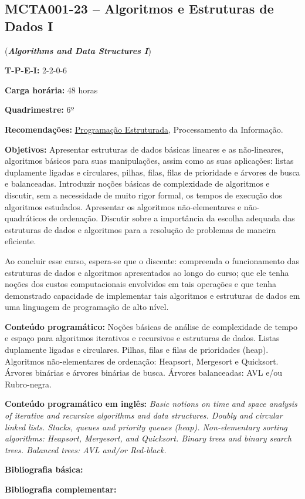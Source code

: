 \documentclass[class=article, crop=false]{standalone}
\begin{document}
\subsection{MCTA001-23 -- Algoritmos e Estruturas de Dados I}
\label{disc:aedI}

(\textbf{\textit{Algorithms and Data Structures I}})

\begin{center}
    \begin{minipage}{0.85\textwidth}
        \textbf{T-P-E-I:} 2-2-0-6
        
        \textbf{Carga horária:} 48 horas
        
        \textbf{Quadrimestre:} 6º
        
        \textbf{Recomendações:} 
        \hyperref[disc:pe]{Programação Estruturada},
        Processamento da Informação.
    \end{minipage}
\end{center}

\textbf{Objetivos:}
Apresentar estruturas de dados básicas lineares e as não-lineares, algoritmos
básicos para suas manipulações, assim como as suas aplicações: listas
duplamente ligadas e circulares, pilhas, filas, filas de prioridade e árvores
de busca e balanceadas. Introduzir noções básicas de complexidade de algoritmos
e discutir, sem a necessidade de muito rigor formal, os tempos de execução dos
algoritmos estudados. Apresentar os algoritmos não-elementares e
não-quadráticos de ordenação. Discutir sobre a importância da escolha adequada
das estruturas de dados e algoritmos para a resolução de problemas de maneira
eficiente.

Ao concluir esse curso, espera-se que o discente: compreenda o funcionamento
das estruturas de dados e algoritmos apresentados ao longo do curso; que ele
tenha noções dos custos computacionais envolvidos em tais operações e que tenha
demonstrado capacidade de implementar tais algoritmos e estruturas de dados em
uma linguagem de programação de alto nível.

\textbf{Conteúdo programático:}
Noções básicas de análise de complexidade de tempo e espaço para algoritmos
iterativos e recursivos e estruturas de dados.
Listas duplamente ligadas e circulares.
Pilhas, filas e filas de prioridades (heap).
Algoritmos não-elementares de ordenação: Heapsort, Mergesort e Quicksort.
Árvores binárias e árvores binárias de busca.
Árvores balanceadas: AVL e/ou Rubro-negra. 

\textbf{Conteúdo programático em inglês:}
\textit{Basic notions on time and space analysis of iterative and recursive
algorithms and data structures.
Doubly and circular linked lists.
Stacks, queues and priority queues (heap).
Non-elementary sorting algorithms: Heapsort, Mergesort, and Quicksort.
Binary trees and binary search trees.
Balanced trees: AVL and/or Red-black.}

\newrefsection
\textbf{Bibliografia básica:}
\nocite{1998-sedgewick, 2010-szwarcfiter-markenzon, 2012-cormen-etal}
\printbibliography

\newrefsection
\textbf{Bibliografia complementar:}
\nocite{2007-ziviani, 1995-tenenbaum-etal, 1997-schildt, 2009-feofiloff, 2011-sedgewick-wayne}
\printbibliography
\end{document}
